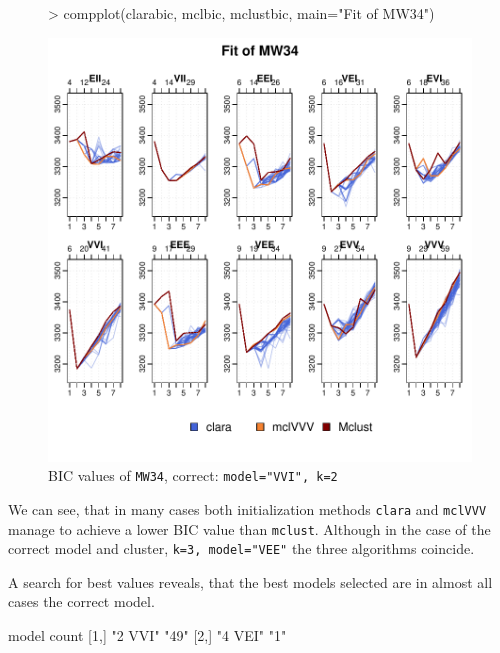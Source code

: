 \begin{figure}[h!]
    \begin{Rgraph}[0.9]
\begin{Schunk}
\begin{Sinput}
>     compplot(clarabic, mclbic, mclustbic, main="Fit of MW34")
\end{Sinput}
\end{Schunk}
\includegraphics{chapter3-figMW34bic}
    \caption{BIC values of {\tt MW34}, correct: {\tt model="VVI", k=2}}
    \label{fig:bicMW34}
    \end{Rgraph}
\end{figure}

We can see, that in many cases both initialization methods {\tt clara} and
{\tt mclVVV} manage to achieve a lower BIC value than {\tt mclust}. Although in
the case of the correct model and cluster, {\tt k=3, model="VEE"} the three 
algorithms coincide.

A search for best values reveals, that the best models selected are in almost 
all cases the correct model.

\begin{Schunk}
\begin{Soutput}
     model   count
[1,] "2 VVI" "49" 
[2,] "4 VEI" "1"  
\end{Soutput}
\end{Schunk}

